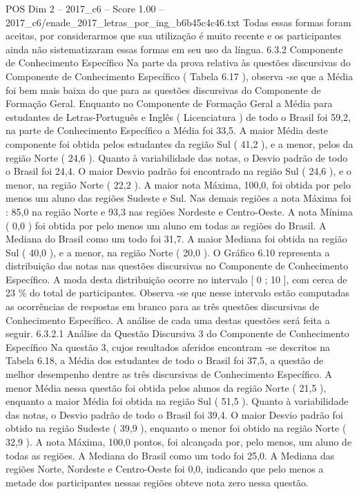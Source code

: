 \begin{textsample}{POS Dim 2 – 2017\_c6 – Score 1.00 – 2017\_c6/enade\_2017\_letras\_por\_ing\_b6b45c4c46.txt}
Todas essas formas foram aceitas, por considerarmos que sua utilização é muito recente e os participantes ainda não sistematizaram essas formas em seu uso da língua. 6.3.2 Componente de Conhecimento Específico Na parte da prova relativa às questões discursivas do Componente de Conhecimento Específico ( Tabela 6.17 ), observa -se que a Média foi bem mais baixa do que para as questões discursivas do Componente de Formação Geral.
Enquanto no Componente de Formação Geral a Média para estudantes de Letras-Português e Inglês ( Licenciatura ) de todo o Brasil foi 59,2, na parte de Conhecimento Específico a Média foi 33,5.
A maior Média deste componente foi obtida pelos estudantes da região Sul ( 41,2 ), e a menor, pelos da região Norte ( 24,6 ).
Quanto à variabilidade das notas, o Desvio padrão de todo o Brasil foi 24,4.
O maior Desvio padrão foi encontrado na região Sul ( 24,6 ), e o menor, na região Norte ( 22,2 ).
A maior nota Máxima, 100,0, foi obtida por pelo menos um aluno das regiões Sudeste e Sul.
Nas demais regiões a nota Máxima foi : 85,0 na região Norte e 93,3 nas regiões Nordeste e Centro-Oeste.
A nota Mínima ( 0,0 ) foi obtida por pelo menos um aluno em todas as regiões do Brasil.
A Mediana do Brasil como um todo foi 31,7.
A maior Mediana foi obtida na região Sul ( 40,0 ), e a menor, na região Norte ( 20,0 ).
O Gráfico 6.10 representa a distribuição das notas nas questões discursivas no Componente de Conhecimento Específico.
A moda desta distribuição ocorre no intervalo [ 0 ; 10 ], com cerca de 23 \% do total de participantes.
Observa -se que nesse intervalo estão computadas as ocorrências de respostas em branco para as três questões discursivas de Conhecimento Específico.
A análise de cada uma destas questões será feita a seguir. 6.3.2.1 Análise da Questão Discursiva 3 do Componente de Conhecimento Específico Na questão 3, cujos resultados aferidos encontram -se descritos na Tabela 6.18, a Média dos estudantes de todo o Brasil foi 37,5, a questão de melhor desempenho dentre as três discursivas de Conhecimento Específico.
A menor Média nessa questão foi obtida pelos alunos da região Norte ( 21,5 ), enquanto a maior Média foi obtida na região Sul ( 51,5 ).
Quanto à variabilidade das notas, o Desvio padrão de todo o Brasil foi 39,4.
O maior Desvio padrão foi obtido na região Sudeste ( 39,9 ), enquanto o menor foi obtido na região Norte ( 32,9 ).
A nota Máxima, 100,0 pontos, foi alcançada por, pelo menos, um aluno de todas as regiões.
A Mediana do Brasil como um todo foi 25,0.
A Mediana das regiões Norte, Nordeste e Centro-Oeste foi 0,0, indicando que pelo menos a metade dos participantes nessas regiões obteve nota zero nessa questão.

\end{textsample}
